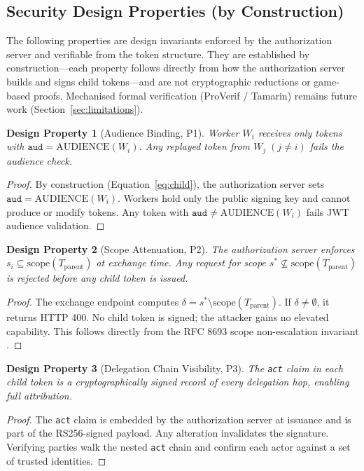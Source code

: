 \documentclass[journal]{IEEEtran}
\newtheorem{theorem}{Design Property}          %
\theoremstyle{definition}
\begin{document}
\subsection{Security Design Properties (by Construction)}

The following properties are design invariants enforced by the authorization
server and verifiable from the token structure. They are established by
construction---each property follows directly from how the authorization server
builds and signs child tokens---and are not cryptographic reductions or
game-based proofs. Mechanised formal verification (ProVerif / Tamarin) remains
future work (Section~\ref{sec:limitations}).

\begin{theorem}[Audience Binding, P1]
\label{thm:p1}
Worker $W_i$ receives only tokens with $\texttt{aud}=\mathrm{AUDIENCE}(W_i)$.
Any replayed token from $W_j\;(j\neq i)$ fails the audience check.
\end{theorem}
\begin{proof}
By construction (Equation~\ref{eq:child}), the authorization server sets
$\texttt{aud}=\mathrm{AUDIENCE}(W_i)$. Workers hold only the public signing
key and cannot produce or modify tokens. Any token with
$\texttt{aud}\neq\mathrm{AUDIENCE}(W_i)$ fails JWT audience validation.
\end{proof}

\begin{theorem}[Scope Attenuation, P2]
\label{thm:p2}
The authorization server enforces $s_i \subseteq \mathrm{scope}(T_{\mathrm{parent}})$
at exchange time. Any request for scope $s^* \not\subseteq
\mathrm{scope}(T_{\mathrm{parent}})$ is rejected before any child token is issued.
\end{theorem}
\begin{proof}
The exchange endpoint computes $\delta = s^* \setminus
\mathrm{scope}(T_{\mathrm{parent}})$. If $\delta\neq\emptyset$, it returns HTTP
400. No child token is signed; the attacker gains no elevated capability.
This follows directly from the RFC 8693 scope non-escalation invariant
\cite{rfc8693}.
\end{proof}

\begin{theorem}[Delegation Chain Visibility, P3]
\label{thm:p3}
The \texttt{act} claim in each child token is a cryptographically signed record
of every delegation hop, enabling full attribution.
\end{theorem}
\begin{proof}
The \texttt{act} claim is embedded by the authorization server at issuance and
is part of the RS256-signed payload. Any alteration invalidates the signature.
Verifying parties walk the nested \texttt{act} chain and confirm each actor
against a set of trusted identities.
\end{proof}
\end{document}
